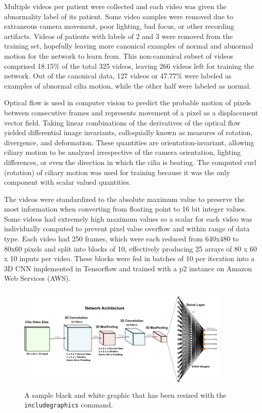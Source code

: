 Multiple videos per patient were collected and each video was given the abnormality label of its patient. Some video samples were removed due to extraneous camera movement, poor lighting, bad focus, or other recording artifacts. Videos of patients with labels of 2 and 3 were removed from the training set, hopefully leaving more canonical examples of normal and abnormal motion for the network to learn from. This non-canonical subset of videos comprised 18.15\% of  the total 325 videos, leaving 266 videos left for training the network. Out of the canonical data, 127 videos or 47.77\% were labeled as examples of abnormal cilia motion, while the other half were labeled as normal.
 
 
Optical flow is used in computer vision to predict the probable motion of pixels between consecutive frames and represents movement of a pixel as a displacement vector field. Taking linear combinations of the derivatives of the optical flow yielded differential image invariants, colloquially known as measures of rotation, divergence, and deformation. These quantities are orientation-invariant, allowing ciliary motion to be analyzed irrespective of the camera orientation, lighting differences, or even the direction in which the cilia is beating\cite{quinn2015automated}. The computed curl (rotation) of ciliary motion was used for training because it was the only component with scalar valued quantities. 
 
The videos were standardized to the absolute maximum value to preserve the most information when converting from floating point to 16 bit integer values. Some videos had extremely high maximum values so a scalar for each video was individually computed to prevent pixel value overflow and within range of data type. Each video had 250 frames, which were each reduced from 640x480 to 80x60 pixels and split into blocks of 10, effectively producing 25 arrays of 80 x 60 x 10 inputs per video. These blocks were fed in batches of 10 per iteration into a 3D CNN implemented in Tensorflow and trained with a p2 instance on Amazon Web Services (AWS). 

\begin{figure}
\includegraphics[height=2in, width=4in]{arch}
\caption{A sample black and white graphic that has
been resized with the \texttt{includegraphics} command.}
\end{figure}
\setlength{\textfloatsep}{5pt}


